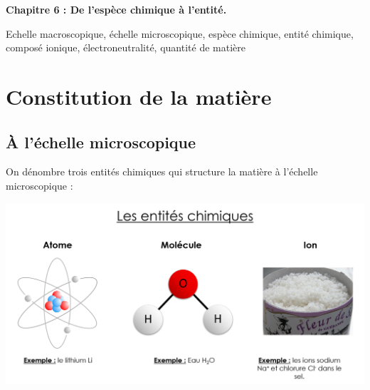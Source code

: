 
\renewcommand{\thesubsection}{\textcolor{red}{\Roman{section}.\arabic{subsection}}}
\renewcommand{\thesubsubsection}{\textcolor{red}{\Roman{section}.\arabic{subsection}.\alph{subsubsection}}}

\setcounter{section}{0}

\begin{mdframed}[style=titr, leftmargin=60pt, rightmargin=60pt, innertopmargin=7pt, innerbottommargin=7pt, innerrightmargin=8pt, innerleftmargin=8pt]

\begin{center}
\large{\textbf{Chapitre 6 : De l'espèce chimique à l'entité.}}
\end{center}
\end{mdframed}


\begin{tcolorbox}[colback=blue!5!white,colframe=blue!75!black,title=Mots clés du chapitre :]
Echelle macroscopique, échelle microscopique, espèce chimique, entité chimique, composé ionique, électroneutralité, quantité de matière
\end{tcolorbox}


\section{Constitution de la matière}
\subsection{\`{A} l'échelle microscopique}
On dénombre trois entités chimiques qui structure la matière à l'échelle microscopique :
\begin{center}
    \includegraphics[scale=0.5]{Images/Entites_chimiques.png}
\end{center}


